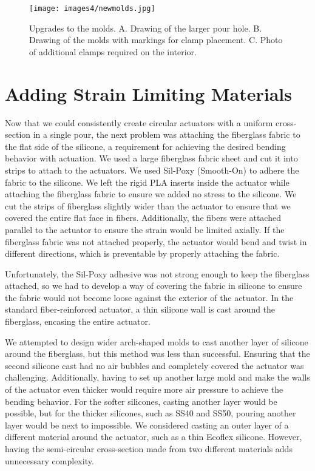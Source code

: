 \begin{figure}[ht]
    \centering
    \texttt{[image: images4/newmolds.jpg]}
    \caption{Upgrades to the molds. A. Drawing of the larger pour hole. B. Drawing of the molds with markings for clamp placement. C. Photo of additional clamps required on the interior.}
    \label{fig:newmolds}
\end{figure}

\clearpage
\section{Adding Strain Limiting Materials}
Now that we could consistently create circular actuators with a uniform cross-section in a single pour, the next problem was attaching the fiberglass fabric to the flat side of the silicone, a requirement for achieving the desired bending behavior with actuation. We used a large fiberglass fabric sheet and cut it into strips to attach to the actuators. We used Sil-Poxy (Smooth-On) to adhere the fabric to the silicone. We left the rigid PLA inserts inside the actuator while attaching the fiberglass fabric to ensure we added no stress to the silicone. We cut the strips of fiberglass slightly wider than the actuator to ensure that we covered the entire flat face in fibers. Additionally, the fibers were attached parallel to the actuator to ensure the strain would be limited axially. If the fiberglass fabric was not attached properly, the actuator would bend and twist in different directions, which is preventable by properly attaching the fabric. 

Unfortunately, the Sil-Poxy adhesive was not strong enough to keep the fiberglass attached, so we had to develop a way of covering the fabric in silicone to ensure the fabric would not become loose against the exterior of the actuator. In the standard fiber-reinforced actuator, a thin silicone wall is cast around the fiberglass, encasing the entire actuator. 

We attempted to design wider arch-shaped molds to cast another layer of silicone around the fiberglass, but this method was less than successful. Ensuring that the second silicone cast had no air bubbles and completely covered the actuator was challenging. Additionally, having to set up another large mold and make the walls of the actuator even thicker would require more air pressure to achieve the bending behavior. For the softer silicones, casting another layer would be possible, but for the thicker silicones, such as SS40 and SS50, pouring another layer would be next to impossible. We considered casting an outer layer of a different material around the actuator, such as a thin Ecoflex silicone. However, having the semi-circular cross-section made from two different materials adds unnecessary complexity. 

